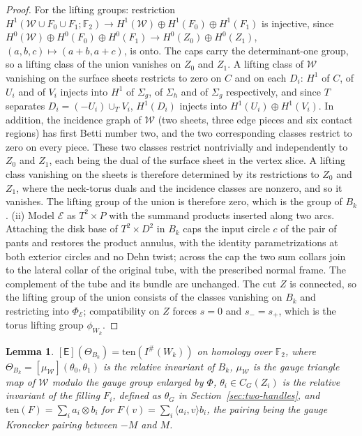 \documentclass[11pt]{amsart}
\newtheorem{lemma}[theorem]{Lemma}
\theoremstyle{definition}
\theoremstyle{remark}
\theoremstyle{plain}
\numberwithin{equation}{section}
\newcommand{\FF}{\mathbb{F}_2}
\newcommand{\Ish}{I^{\#}}
\begin{document}
\begin{proof}
For the lifting groups: restriction
$H^1(\mathscr W\cup F_0\cup F_1;\FF)\to H^1(\mathscr W)\oplus H^1(F_0)\oplus H^1(F_1)$ is injective, since
$H^0(\mathscr W)\oplus H^0(F_0)\oplus H^0(F_1)\to H^0(Z_0)\oplus H^0(Z_1)$, $(a,b,c)\mapsto(a+b,a+c)$, is
onto. The caps carry the determinant-one group, so a lifting class of the
union vanishes on $Z_0$ and $Z_1$. A lifting class of $\mathscr W$ vanishing on the surface
sheets restricts to zero on $C$ and on each $D_i$: $H^1$ of $C$, of $U_i$ and of $V_i$
injects into $H^1$ of $\Sigma_g$, of $\Sigma_h$ and of $\Sigma_g$ respectively, and since $T$
separates $D_i=(-U_i)\cup_TV_i$, $H^1(D_i)$ injects into $H^1(U_i)\oplus H^1(V_i)$. In addition, the
incidence graph of $\mathscr W$ (two sheets, three edge pieces and six contact
regions) has first Betti number two, and the two corresponding classes restrict
to zero on every piece. These two classes restrict nontrivially and
independently to $Z_0$ and $Z_1$, each being the dual of the surface sheet in the
vertex slice. A lifting class vanishing on the sheets is therefore determined by its
restrictions to $Z_0$ and $Z_1$, where the neck-torus duals and the incidence
classes are nonzero, and so it vanishes. The
lifting group of the union is therefore zero, which is the group of $B_k$.
(ii) Model $\mathcal E$ as $T^2\times P$ with the summand products inserted along two
arcs. Attaching the disk base of $T^2\times D^2$ in $B_k$ caps the input circle $c$
of the pair of pants and restores the product annulus, with the identity
parametrizations at both exterior circles and no Dehn twist; across the cap the
two sum collars join to the lateral collar of the original tube, with the
prescribed normal frame. The complement of the tube and its bundle are unchanged.
The cut $Z$ is connected, so the lifting group of the union consists of the
classes vanishing on $B_k$ and restricting into $\Phi_{\mathcal E}$; compatibility on $Z$
forces $s=0$ and $s_-=s_+$, which is the torus lifting group $\phi_{W_k}$.
\end{proof}

\begin{lemma}\label{lem:handle-state}
$[\mathsf E](\Theta_{B_k})=\mathrm{ten}(\Ish(W_k))$ on homology over $\FF$, where
$\Theta_{B_k}=[\mu_{\mathscr W}](\theta_0,\theta_1)$ is the relative invariant of $B_k$,
$\mu_{\mathscr W}$ is the gauge triangle map of $\mathscr W$ modulo the gauge group enlarged
by $\Phi$,
$\theta_i\in C_G(Z_i)$ is the relative invariant of the filling $F_i$, defined as $\theta_G$ in
Section~\ref{sec:two-handles}, and $\mathrm{ten}(F)=\sum_ia_i\otimes b_i$
for $F(v)=\sum_i\langle a_i,v\rangle b_i$, the pairing being the gauge Kronecker
pairing between $-M$ and $M$.
\end{lemma}
\end{document}

